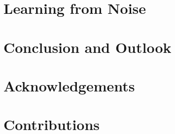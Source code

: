 \documentclass[a4paper,11pt,twoside,openany]{book}
\begin{document}
\chapter{Learning from Noise}\label{ch:deep_learning}


\chapter{Conclusion and Outlook}


% 
\printbibliography[heading=bibintoc, title={Bibliography}]


\chapter*{Acknowledgements}


\chapter*{Contributions}


% 


\clearpage
{}

\begin{appendices}
  
  
\end{appendices}
\end{document}
